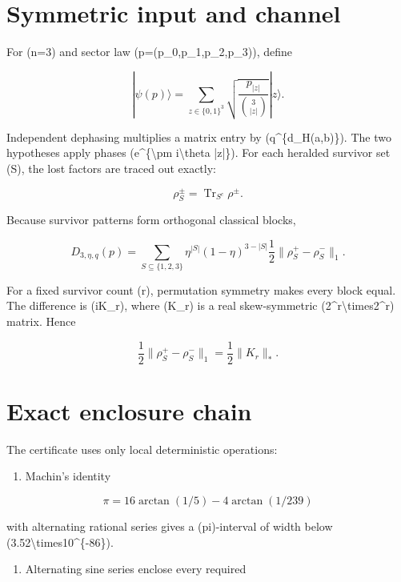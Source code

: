 \documentclass[11pt,a4paper,openany]{report}
\begin{document}
\section{Symmetric input and channel}

For (n=3) and sector law (p=(p\_0,p\_1,p\_2,p\_3)), define

\[
|\psi(p)\rangle
=\sum_{z\in\{0,1\}^3}
\sqrt{\frac{p_{|z|}}{\binom3{|z|}}}|z\rangle.
\]

Independent dephasing multiplies a matrix entry by (q\textasciicircum{}\{d\_H(a,b)\}). The two hypotheses apply phases (e\textasciicircum{}\{\textbackslash{}pm i\textbackslash{}theta |z|\}). For each heralded survivor set (S), the lost factors are traced out exactly:

\[
\rho_S^\pm
=\operatorname{Tr}_{S^c}\rho^\pm.
\]

Because survivor patterns form orthogonal classical blocks,

\[
D_{3,\eta,q}(p)
=\sum_{S\subseteq\{1,2,3\}}
\eta^{|S|}(1-\eta)^{3-|S|}
\frac12\|\rho_S^+-\rho_S^-\|_1.
\]

For a fixed survivor count (r), permutation symmetry makes every block equal. The difference is (iK\_r), where (K\_r) is a real skew-symmetric (2\textasciicircum{}r\textbackslash{}times2\textasciicircum{}r) matrix. Hence

\[
\frac12\|\rho_S^+-\rho_S^-\|_1
=\frac12\|K_r\|_*.
\]

\section{Exact enclosure chain}

The certificate uses only local deterministic operations:

\begin{enumerate}
\item 
Machin's identity

\end{enumerate}

\[
\pi=16\arctan(1/5)-4\arctan(1/239)
\]

with alternating rational series gives a (pi)-interval of width below (3.52\textbackslash{}times10\textasciicircum{}\{-86\}).

\begin{enumerate}
\item 
Alternating sine series enclose every required

\end{enumerate}
\end{document}

